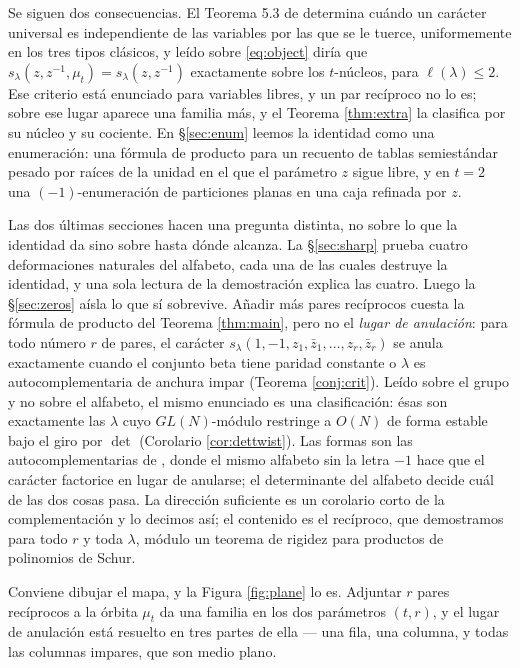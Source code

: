 \documentclass[11pt,reqno]{amsart}
\theoremstyle{plain}
\theoremstyle{definition}
\newcommand{\zt}{\mu_t}
\begin{document}
Se siguen dos consecuencias. El Teorema 5.3 de \cite{AK25} determina cuándo un carácter universal es
independiente de las variables por las que se le tuerce, uniformemente en los tres tipos clásicos, y
leído sobre \eqref{eq:object} diría que
$s_\lambda(z,z^{-1},\zt)=s_\lambda(z,z^{-1})$ exactamente sobre los $t$-núcleos, para
$\ell(\lambda)\le2$. Ese criterio está enunciado para variables libres, y un par recíproco no lo es;
sobre ese lugar aparece una familia más, y el Teorema \ref{thm:extra} la clasifica por su núcleo y su cociente. En
\S\ref{sec:enum} leemos la identidad como una enumeración: una fórmula de producto para un recuento
de tablas semiestándar pesado por raíces de la unidad en el que el parámetro $z$ sigue libre, y en
$t=2$ una $(-1)$-enumeración de particiones planas en una caja refinada por $z$.

Las dos últimas secciones hacen una pregunta distinta, no sobre lo que la identidad da sino sobre
hasta dónde alcanza. La \S\ref{sec:sharp} prueba cuatro deformaciones naturales del alfabeto, cada
una de las cuales destruye la identidad, y una sola lectura de la demostración explica las
cuatro. Luego la
\S\ref{sec:zeros} aísla lo que sí sobrevive. Añadir más pares recíprocos cuesta la fórmula de
producto del Teorema \ref{thm:main}, pero
no el \emph{lugar de anulación}: para todo número $r$ de pares, el carácter
$s_\lambda(1,-1,z_1,\bar z_1,\dots,z_r,\bar z_r)$ se anula exactamente cuando el conjunto beta tiene
paridad constante o $\lambda$ es autocomplementaria de anchura impar (Teorema \ref{conj:crit}).
Leído sobre el grupo y no sobre el alfabeto, el mismo enunciado es una clasificación: ésas son
exactamente las $\lambda$ cuyo $GL(N)$-módulo restringe a $O(N)$ de forma estable bajo el giro por
$\det$ (Corolario \ref{cor:dettwist}). Las formas son las autocomplementarias de \cite{AB19}, donde el mismo
alfabeto sin la letra $-1$ hace que el carácter factorice en lugar de anularse; el determinante del
alfabeto decide cuál de las dos cosas pasa. La dirección suficiente es un corolario corto de la
complementación y lo decimos así; el contenido es el recíproco, que demostramos para todo $r$ y toda
$\lambda$, módulo un teorema de rigidez para productos de polinomios de Schur.

Conviene dibujar el mapa, y la Figura \ref{fig:plane} lo es. Adjuntar $r$ pares recíprocos a la
órbita $\zt$ da una familia en los dos parámetros $(t,r)$, y el lugar de anulación está resuelto en
tres partes de ella --- una fila, una columna, y todas las columnas impares, que son medio plano.
\end{document}
